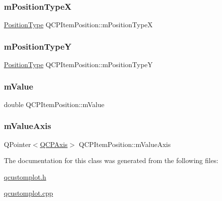 \subsubsection{\texorpdfstring{m\+Position\+TypeX}{mPositionTypeX}}
{\footnotesize\ttfamily \hyperlink{class_q_c_p_item_position_aad9936c22bf43e3d358552f6e86dbdc8}{Position\+Type} Q\+C\+P\+Item\+Position\+::m\+Position\+TypeX\hspace{0.3cm}{\ttfamily [protected]}}

\mbox{\label{class_q_c_p_item_position_a47c96c0ef4380e1af4aaa7c2265c260b}} 
\subsubsection{\texorpdfstring{m\+Position\+TypeY}{mPositionTypeY}}
{\footnotesize\ttfamily \hyperlink{class_q_c_p_item_position_aad9936c22bf43e3d358552f6e86dbdc8}{Position\+Type} Q\+C\+P\+Item\+Position\+::m\+Position\+TypeY\hspace{0.3cm}{\ttfamily [protected]}}

\mbox{\label{class_q_c_p_item_position_a67bf5df69f587d53731724a7d61c6c3f}} 
\subsubsection{\texorpdfstring{m\+Value}{mValue}}
{\footnotesize\ttfamily double Q\+C\+P\+Item\+Position\+::m\+Value\hspace{0.3cm}{\ttfamily [protected]}}

\mbox{\label{class_q_c_p_item_position_a505dc2da24ba274452c1c817fcaba011}} 
\subsubsection{\texorpdfstring{m\+Value\+Axis}{mValueAxis}}
{\footnotesize\ttfamily Q\+Pointer$<$\hyperlink{class_q_c_p_axis}{Q\+C\+P\+Axis}$>$ Q\+C\+P\+Item\+Position\+::m\+Value\+Axis\hspace{0.3cm}{\ttfamily [protected]}}



The documentation for this class was generated from the following files\+:\begin{DoxyCompactItemize}
\item 
\hyperlink{qcustomplot_8h}{qcustomplot.\+h}\item 
\hyperlink{qcustomplot_8cpp}{qcustomplot.\+cpp}\end{DoxyCompactItemize}
